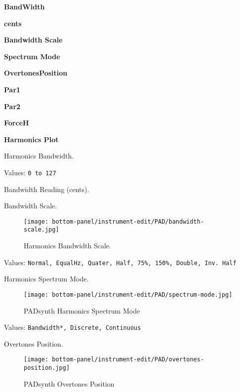    \begin{enumber}
      \item \textbf{BandWidth}
      \item \textbf{cents}
      \item \textbf{Bandwidth Scale}
      \item \textbf{Spectrum Mode}
      \item \textbf{OvertonesPosition}
      \item \textbf{Par1}
      \item \textbf{Par2}
      \item \textbf{ForceH}
      \item \textbf{Harmonics Plot}
   \end{enumber}

   \setcounter{ItemCounter}{0}      %

   Harmonics Bandwidth.

   Values: \texttt{0 to 127}

   Bandwidth Reading (cents).

   Bandwidth Scale.

\begin{figure}[H]
   \centering
   \texttt{[image: bottom-panel/instrument-edit/PAD/bandwidth-scale.jpg]}
   \caption{Harmonics Bandwidth Scale.}
   \label{fig:padsynth_harmonics_bandwidth_scale}
\end{figure}

   Values: \texttt{Normal, EqualHz, Quater, Half, 75\%, 150\%, Double, Inv.  Half}

   Harmonics Spectrum Mode.

\begin{figure}[H]
   \centering
   \texttt{[image: bottom-panel/instrument-edit/PAD/spectrum-mode.jpg]}
   \caption{PADsynth Harmonics Spectrum Mode}
   \label{fig:padsynth_harmonics_spectrum mode}
\end{figure}

   Values: \texttt{Bandwidth*, Discrete, Continuous}

   Overtones Position.

\begin{figure}[H]
   \centering
   \texttt{[image: bottom-panel/instrument-edit/PAD/overtones-position.jpg]}
   \caption{PADsynth Overtones Position}
   \label{fig:padsynth_overtones_position}
\end{figure}

